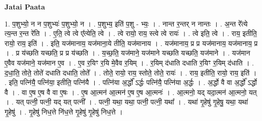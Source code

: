 \documentclass[17pt]{extarticle}
\begin{document}
\textbf{Jatai Paata} \newline

1. प॒शुभ्यो॒ न न प॒शुभ्यः॑ प॒शुभ्यो॒ न । . प॒शुभ्य॒ इति॑ प॒शु - भ्यः॒ । . नान्त र॒न्तर् न नान्तः । . अ॒न्त रे᳚त्ये त्य॒न्त र॒न्त रे॑ति । . ए॒ति॒ त्वे त्वे ए᳚त्येति॒ त्वे । . त्वे रायो॒ राय॒ स्त्वे त्वे रायः॑ । . त्वे इति॒ त्वे । . राय॒ इतीति॒ रायो॒ राय॒ इति॑ । . इति॒ यज॑मानाय॒ यज॑माना॒ये तीति॒ यज॑मानाय । . यज॑मानाय॒ प्र प्र यज॑मानाय॒ यज॑मानाय॒ प्र । . प्र य॑च्छति यच्छति॒ प्र प्र य॑च्छति । . य॒च्छ॒ति॒ यज॑माने॒ यज॑माने यच्छति यच्छति॒ यज॑माने । . यज॑मान ए॒वैव यज॑माने॒ यज॑मान ए॒व । . ए॒व र॒यिꣳ र॒यि मे॒वैव र॒यिम् । . र॒यिम् द॑धाति दधाति र॒यिꣳ र॒यिम् द॑धाति । . द॒धा॒ति॒ तोते॒ तोते॑ दधाति दधाति॒ तोते᳚ । . तोते॒ रायो॒ राय॒ स्तोते॒ तोते॒ रायः॑ । . राय॒ इतीति॒ रायो॒ राय॒ इति॑ । . इति॒ पत्नि॑यै॒ पत्नि॑या॒ इतीति॒ पत्नि॑यै । . पत्नि॑या अ॒र्द्धो᳚ ऽर्द्धः पत्नि॑यै॒ पत्नि॑या अ॒र्द्धः । . अ॒र्द्धो वै वा अ॒र्द्धो᳚ ऽर्द्धो वै । . वा ए॒ष ए॒ष वै वा ए॒षः । . ए॒ष आ॒त्मन॑ आ॒त्मन॑ ए॒ष ए॒ष आ॒त्मनः॑ । . आ॒त्मनो॒ यद् यदा॒त्मन॑ आ॒त्मनो॒ यत् । . यत् पत्नी॒ पत्नी॒ यद् यत् पत्नी᳚ । . पत्नी॒ यथा॒ यथा॒ पत्नी॒ पत्नी॒ यथा᳚ । . यथा॑ गृ॒हेषु॑ गृ॒हेषु॒ यथा॒ यथा॑ गृ॒हेषु॑ । . गृ॒हेषु॑ निध॒त्ते नि॑ध॒त्ते गृ॒हेषु॑ गृ॒हेषु॑ निध॒त्ते । \newline
\end{document}
